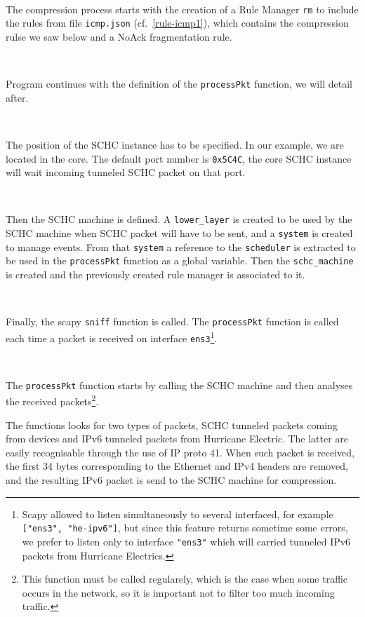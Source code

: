 \documentclass[onecolumn,12pt]{book}
\newcounter{c}
\begin{document}
~~

The compression process starts with the creation of a Rule Manager \texttt{rm} to include the rules from file \texttt{icmp.json} (cf.~\vref{rule-icmp1}), which contains  the compression rulse we saw below and a NoAck fragmentation rule.

~~

Program continues with the definition of the \texttt{processPkt} function, we will detail after.

~~

The position of the SCHC instance has to be specified. In our example, we are located in the core. The default port number is \texttt{0x5C4C}, the core SCHC instance will wait incoming tunneled SCHC packet on that port.

~~~

Then the SCHC machine is defined. A \texttt{lower\_layer} is created to be used by the SCHC machine when SCHC packet will have to be sent, and a \texttt{system} is created to manage events. From that \texttt{system} a reference to the \texttt{scheduler} is extracted to be used in the \texttt{processPkt} function as a global variable. Then the \texttt{schc\_machine} is created and the previously created rule manager is associated to it.

~~~

Finally, the scapy \texttt{sniff} function is called. The \texttt{processPkt} function is called each time a packet is received on interface \texttt{ens3}\footnote{Scapy allowed to listen simultaneously to several interfaced, for example \texttt{["ens3", "he-ipv6"]}, but since this feature returns sometime some errors, we prefer to listen only to interface \texttt{"ens3"} which will carried tunneled IPv6 packets from Hurricane Electrics.}.

~~~

The \texttt{processPkt} function starts by calling the SCHC machine and then analyses the received packets\footnote{This function must be called regularely, which is the case when some traffic occurs in the network, so it is important not to filter too much incoming traffic.}. 

The functions looks for two types of packets, SCHC tunneled packets coming from devices and IPv6 tunneled packets from Hurricane Electric. The latter are easily recognisable through the use of IP proto 41. When such packet is received, the first 34 bytes corresponding to the Ethernet and IPv4 headers are removed, and the resulting IPv6 packet is send to the SCHC machine for compression.
\end{document}
